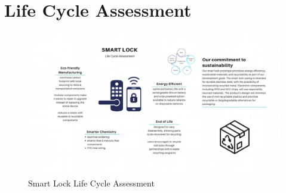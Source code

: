 \section{Life Cycle Assessment}


\begin{figure}[htbp]
    \centering
    \includegraphics[width=1 \linewidth]{./img/LifeCycleAssessment.png}
    \caption{Smart Lock Life Cycle Assessment}
    \label{fig:enter-label}
\end{figure}
